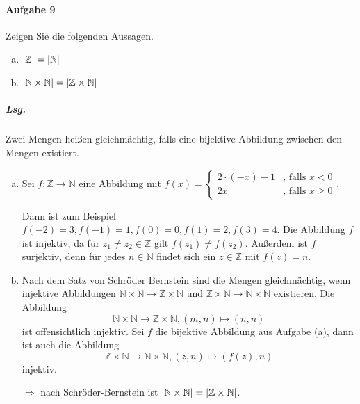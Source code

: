 \documentclass{scrreprt}
\begin{document}
\newpage
\paragraph{Aufgabe 9} Zeigen Sie die folgenden Aussagen.
\begin{enumerate}[(a)]
\item $\abs{\mathbb{Z}} = \abs{\mathbb{N}}$
\item $\abs{\mathbb{N} \times \mathbb{N}} = \abs{\mathbb{Z} \times \mathbb{N}}$
\end{enumerate}

\subparagraph{Lsg.} Zwei Mengen heißen gleichmächtig, falls eine bijektive
Abbildung zwischen den Mengen existiert.

\begin{enumerate}[(a)]
\item Sei $f \colon \mathbb{Z} \to \mathbb{N}$ eine Abbildung mit
  $f(x) = \begin{cases}
    2 \cdot (-x) - 1 & \text{, falls } x < 0 \\
    2x & \text{, falls } x \geq 0
  \end{cases}$.

  Dann ist zum Beispiel $f(-2) = 3, f(-1) = 1, f(0) = 0, f(1) = 2, f(3) = 4$.
  Die Abbildung $f$ ist injektiv, da für $z_1 \ne z_2 \in \mathbb{Z}$ gilt
  $f(z_1) \ne f(z_2)$.
  Außerdem ist $f$ surjektiv, denn für jedes $n \in \mathbb{N}$ findet sich ein
  $z \in \mathbb{Z}$ mit $f(z) = n$.

\item Nach dem Satz von Schröder Bernstein sind die Mengen gleichmächtig,
  wenn injektive Abbildungen
  $\mathbb{N} \times \mathbb{N} \to \mathbb{Z} \times \mathbb{N}$ und
  $\mathbb{Z} \times \mathbb{N} \to \mathbb{N} \times \mathbb{N}$ existieren.
  Die Abbildung
  \[
    \mathbb{N} \times \mathbb{N} \to \mathbb{Z} \times \mathbb{N},
    (m, n) \mapsto (n, n)
  \]
  ist offensichtlich injektiv.
  Sei $f$ die bijektive Abbildung aus Aufgabe (a), dann ist auch die Abbildung
  \[
    \mathbb{Z} \times \mathbb{N} \to \mathbb{N} \times \mathbb{N},
    (z, n) \mapsto (f(z), n)
  \]
  injektiv.

  $\Rightarrow$ nach Schröder-Bernstein ist
  $\abs{\mathbb{N} \times \mathbb{N}} = \abs{\mathbb{Z} \times \mathbb{N}}$.
\end{enumerate}
\end{document}
